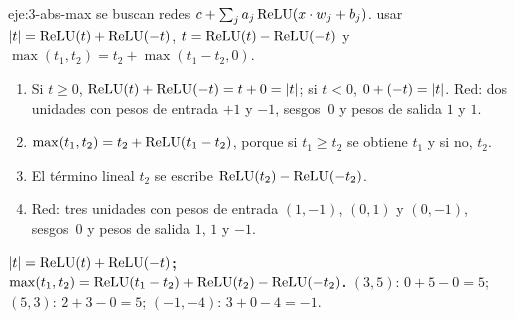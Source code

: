 \begin{solucion}{eje:3-abs-max}
\datos se buscan redes $c+\sum_ja_j\operatorname{ReLU}(x\cdot w_j+b_j)$.
\planteamiento usar $\lvert t\rvert=\operatorname{ReLU}(t)+\operatorname{ReLU}(-t)$, $t=\operatorname{ReLU}(t)-\operatorname{ReLU}(-t)$ y $\max(t_1,t_2)=t_2+\max(t_1-t_2,0)$.
\pasos
\begin{enumerate}[label=\arabic*.]
  \item Si $t\ge 0$, $\operatorname{ReLU}(t)+\operatorname{ReLU}(-t)=t+0=\lvert t\rvert$; si $t<0$, $0+(-t)=\lvert t\rvert$. Red: dos unidades con pesos de entrada $+1$ y $-1$, sesgos~0 y pesos de salida $1$ y $1$.
  \item $\max(t_1,t_2)=t_2+\operatorname{ReLU}(t_1-t_2)$, porque si $t_1\ge t_2$ se obtiene $t_1$ y si no, $t_2$.
  \item El término lineal $t_2$ se escribe $\operatorname{ReLU}(t_2)-\operatorname{ReLU}(-t_2)$.
  \item Red: tres unidades con pesos de entrada $(1,-1)$, $(0,1)$ y $(0,-1)$, sesgos~0 y pesos de salida $1$, $1$ y $-1$.
\end{enumerate}
\resultado \textbf{$\lvert t\rvert=\operatorname{ReLU}(t)+\operatorname{ReLU}(-t)$; $\max(t_1,t_2)=\operatorname{ReLU}(t_1-t_2)+\operatorname{ReLU}(t_2)-\operatorname{ReLU}(-t_2)$.}
\comprobacion $(3,5)$: $0+5-0=5$; $(5,3)$: $2+3-0=5$; $(-1,-4)$: $3+0-4=-1$.
\end{solucion}

